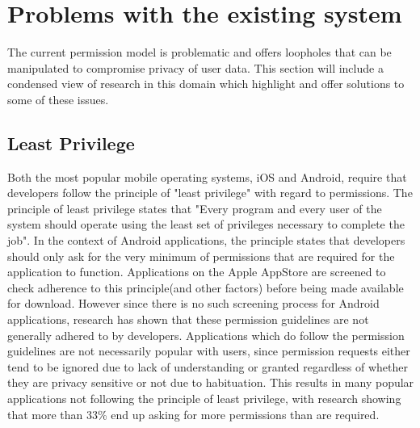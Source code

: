 \section{Problems with the existing system}
The current permission model is problematic and offers loopholes that can be manipulated to compromise privacy of user data. This section will include a condensed view of research in this domain which highlight and offer solutions to some of these issues. 

\subsection{Least Privilege}
Both the most popular mobile operating systems, iOS and Android, require that developers follow the principle of "least privilege" with regard to permissions. The principle of least privilege states that "Every program and every user of the system should operate using the least set of privileges necessary to complete the job"\cite{schneider2004least}. In the context of Android applications, the principle states that developers should only ask for the very minimum of permissions that are required for the application to function\cite{enck2009understanding}. Applications on the Apple AppStore are screened to check adherence to this principle(and other factors) before being made available for download\cite{gilbert2011vision}. However since there is no such screening process for Android applications, research has shown that these permission guidelines are not generally adhered to by developers\cite{stevens2013asking}. Applications which do follow the permission guidelines are not necessarily popular with users, since permission requests either tend to be ignored due to lack of understanding\cite{felt2011android} \cite{kelley2012conundrum} or granted regardless of whether they are privacy sensitive or not due to habituation\cite{felt2012android}. This results in many popular applications not following the principle of least privilege\cite{wei2012permission}, with research showing that more than 33\% end up asking for more permissions than are required\cite{felt2011android}.

